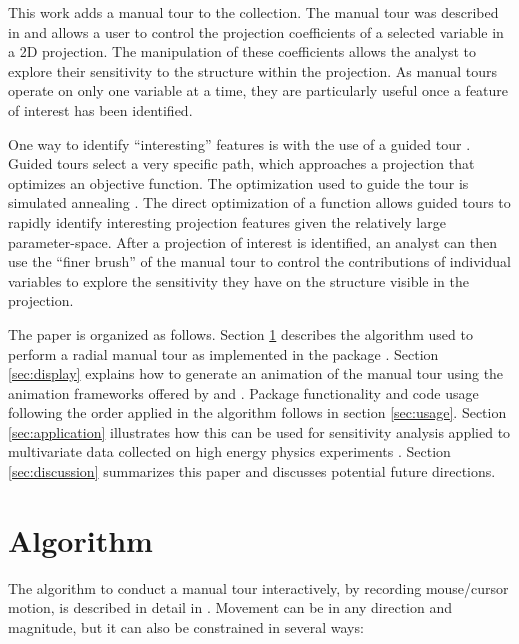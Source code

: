 This work adds a manual tour to the collection. The manual tour was
described in \citet{cook_manual_1997} and allows a user to control the
projection coefficients of a selected variable in a 2D projection. The
manipulation of these coefficients allows the analyst to explore their
sensitivity to the structure within the projection. As manual tours
operate on only one variable at a time, they are particularly useful
once a feature of interest has been identified.

One way to identify ``interesting'' features is with the use of a guided
tour \citep{cook_grand_1995}. Guided tours select a very specific path,
which approaches a projection that optimizes an objective function. The
optimization used to guide the tour is simulated annealing
\citep{kirkpatrick_optimization_1983}. The direct optimization of a
function allows guided tours to rapidly identify interesting projection
features given the relatively large parameter-space. After a projection
of interest is identified, an analyst can then use the ``finer brush''
of the manual tour to control the contributions of individual variables
to explore the sensitivity they have on the structure visible in the
projection.

The paper is organized as follows. Section \ref{sec:algorithm} describes
the algorithm used to perform a radial manual tour as implemented in the
package . Section \ref{sec:display} explains how to
generate an animation of the manual tour using the animation frameworks
offered by  \citep{sievert_interactive_2020} and
 \citep{pedersen_gganimate_2020}. Package
functionality and code usage following the order applied in the
algorithm follows in section \ref{sec:usage}. Section
\ref{sec:application} illustrates how this can be used for sensitivity
analysis applied to multivariate data collected on high energy physics
experiments \citep{wang_mapping_2018}. Section \ref{sec:discussion}
summarizes this paper and discusses potential future directions.

\hypertarget{sec:algorithm}{%
\section{Algorithm}\label{sec:algorithm}}

The algorithm to conduct a manual tour interactively, by recording
mouse/cursor motion, is described in detail in \citet{cook_manual_1997}.
Movement can be in any direction and magnitude, but it can also be
constrained in several ways:

